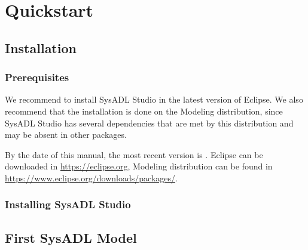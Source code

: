 \chapter{Quickstart}

\section{Installation}
\subsection{Prerequisites}
We recommend to install SysADL Studio in the latest version of Eclipse. We also recommend that the installation is done on the Modeling distribution, since SysADL Studio has several dependencies that are met by this distribution and may be absent in other packages.

By the date of this manual, the most recent version is \versionEclipse. Eclipse can be downloaded in \url{https://eclipse.org}, Modeling distribution can be found in \url{https://www.eclipse.org/downloads/packages/}.

\subsection{Installing SysADL Studio}

\section{First SysADL Model}